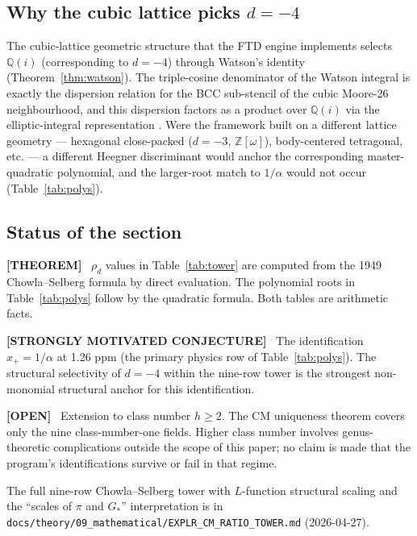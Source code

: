 \documentclass[11pt,reqno]{amsart}
\theoremstyle{plain}
\theoremstyle{definition}
\theoremstyle{remark}
\numberwithin{equation}{section}
\newcommand{\Gstar}{G_{\!*}}
\newenvironment{epistemic}[1]{\par\medskip\noindent\textbf{[#1]}\ }{\par\medskip}
\begin{document}
\subsection{Why the cubic lattice picks $d = -4$}

The cubic-lattice geometric structure that the FTD engine
implements selects $\mathbb{Q}(i)$ (corresponding to $d = -4$)
through Watson's identity (Theorem~\ref{thm:watson}). The triple-cosine
denominator of the Watson integral is exactly the dispersion
relation for the BCC sub-stencil of the cubic Moore-26 neighbourhood,
and this dispersion factors as a product over $\mathbb{Q}(i)$ via the
elliptic-integral representation \cite{glasser}. Were the framework
built on a different lattice geometry --- hexagonal close-packed
($d = -3$, $\mathbb{Z}[\omega]$), body-centered tetragonal, etc.
--- a different Heegner discriminant would anchor the corresponding
master-quadratic polynomial, and the larger-root match to $1/\alpha$
would not occur (Table~\ref{tab:polys}).

\subsection{Status of the section}

\begin{epistemic}{THEOREM}
$\rho_{d}$ values in Table~\ref{tab:tower} are computed from the
1949 Chowla--Selberg formula by direct evaluation. The polynomial
roots in Table~\ref{tab:polys} follow by the quadratic formula. Both
tables are arithmetic facts.
\end{epistemic}

\begin{epistemic}{STRONGLY MOTIVATED CONJECTURE}
The identification $x_{+} = 1/\alpha$ at 1.26 ppm (the primary physics row
of Table~\ref{tab:polys}). The structural
selectivity of $d = -4$ within the nine-row tower is the strongest
non-monomial structural anchor for this identification.
\end{epistemic}

\begin{epistemic}{OPEN}
Extension to class number $h \geq 2$. The CM uniqueness theorem
covers only the nine class-number-one fields. Higher class number
involves genus-theoretic complications outside the scope of this
paper; no claim is made that the program's identifications survive
or fail in that regime.
\end{epistemic}

The full nine-row Chowla--Selberg tower with $L$-function structural
scaling and the ``scales of $\pi$ and $\Gstar$'' interpretation is
in \texttt{docs/theory/09\_mathematical/EXPLR\_CM\_RATIO\_TOWER.md}
(2026-04-27).
\end{document}
